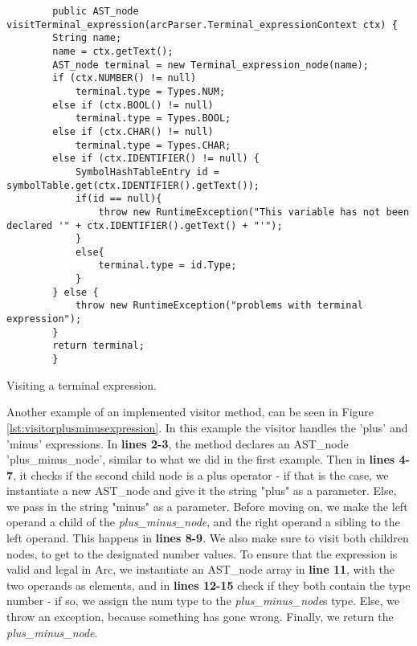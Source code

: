 \begin{listing}[htb!]
    \begin{verbatim}
        public AST_node visitTerminal_expression(arcParser.Terminal_expressionContext ctx) {
        String name;
        name = ctx.getText();
        AST_node terminal = new Terminal_expression_node(name);
        if (ctx.NUMBER() != null)
            terminal.type = Types.NUM;
        else if (ctx.BOOL() != null)
            terminal.type = Types.BOOL;
        else if (ctx.CHAR() != null)
            terminal.type = Types.CHAR;
        else if (ctx.IDENTIFIER() != null) {
            SymbolHashTableEntry id = symbolTable.get(ctx.IDENTIFIER().getText());
            if(id == null){
                throw new RuntimeException("This variable has not been declared '" + ctx.IDENTIFIER().getText() + "'");
            }
            else{
                terminal.type = id.Type;
            }
        } else {
            throw new RuntimeException("problems with terminal expression");
        }
        return terminal;
        }
    \end{verbatim}
    \caption{Visiting a terminal expression.}
    \label{lst:visitorterminalexpression}
\end{listing}

Another example of an implemented visitor method, can be seen in Figure \ref{lst:visitorplusminusexpression}. In this example the visitor handles the 'plus' and 'minus' expressions. In \textbf{lines 2-3}, the method declares an AST\_node 'plus\_minus\_node', similar to what we did in the first example. Then in \textbf{lines 4-7}, it checks if the second child node is a plus operator - if that is the case, we instantiate a new AST\_node and give it the string "plus" as a parameter. Else, we pass in the string "minus" as a parameter. Before moving on, we make the left operand a child of the \textit{plus_minus_node}, and the right operand a sibling to the left operand. This happens in \textbf{lines 8-9}. We also make sure to visit both children nodes, to get to the designated number values. To ensure that the expression is valid and legal in Arc, we instantiate an AST\_node array in \textbf{line 11}, with the two operands as elements, and in \textbf{lines 12-15} check if they both contain the type number - if so, we assign the num type to the \textit{plus_minus_node}s type. Else, we throw an exception, because something has gone wrong. Finally, we return the \textit{plus_minus_node}.

